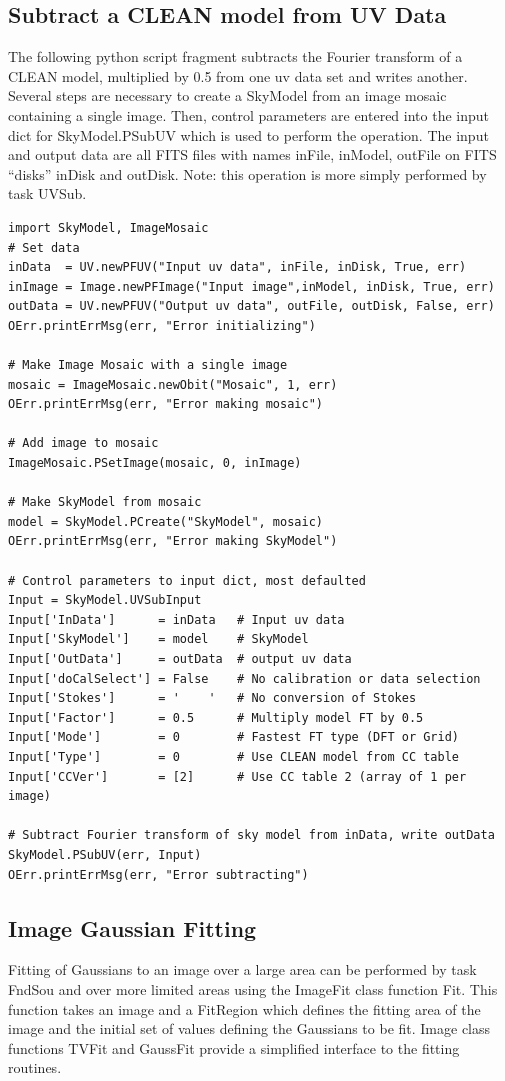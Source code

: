 \documentclass[11pt]{report}
\begin{document}
\subsection{Subtract a CLEAN model from UV Data}
The following python script fragment subtracts the Fourier transform
of a CLEAN model, multiplied by 0.5 from one uv data set and writes
another.
Several steps are necessary to create a SkyModel from an image mosaic
containing a single image.
Then, control parameters are entered into the input dict for
SkyModel.PSubUV which is used to perform the operation.
The input and output data are all FITS files with names inFile,
inModel, outFile on FITS ``disks'' inDisk and outDisk.
Note: this operation is more simply performed by task UVSub.
\begin{verbatim}
import SkyModel, ImageMosaic
# Set data
inData  = UV.newPFUV("Input uv data", inFile, inDisk, True, err)
inImage = Image.newPFImage("Input image",inModel, inDisk, True, err)
outData = UV.newPFUV("Output uv data", outFile, outDisk, False, err)
OErr.printErrMsg(err, "Error initializing")

# Make Image Mosaic with a single image
mosaic = ImageMosaic.newObit("Mosaic", 1, err)
OErr.printErrMsg(err, "Error making mosaic")

# Add image to mosaic
ImageMosaic.PSetImage(mosaic, 0, inImage)

# Make SkyModel from mosaic
model = SkyModel.PCreate("SkyModel", mosaic)
OErr.printErrMsg(err, "Error making SkyModel")

# Control parameters to input dict, most defaulted
Input = SkyModel.UVSubInput
Input['InData']      = inData   # Input uv data
Input['SkyModel']    = model    # SkyModel
Input['OutData']     = outData  # output uv data
Input['doCalSelect'] = False    # No calibration or data selection
Input['Stokes']      = '    '   # No conversion of Stokes
Input['Factor']      = 0.5      # Multiply model FT by 0.5
Input['Mode']        = 0        # Fastest FT type (DFT or Grid)
Input['Type']        = 0        # Use CLEAN model from CC table
Input['CCVer']       = [2]      # Use CC table 2 (array of 1 per image)

# Subtract Fourier transform of sky model from inData, write outData
SkyModel.PSubUV(err, Input)
OErr.printErrMsg(err, "Error subtracting")
\end{verbatim}

\subsection{Image Gaussian Fitting}
Fitting of Gaussians to an image over a large area can be performed by
task FndSou and over more limited areas using the ImageFit class
function Fit.  
This function takes an image and a FitRegion which defines the fitting
area of the image and the initial set of values defining the Gaussians
to be fit.
Image class functions TVFit and GaussFit provide a simplified
interface to the fitting routines.
\end{document}
